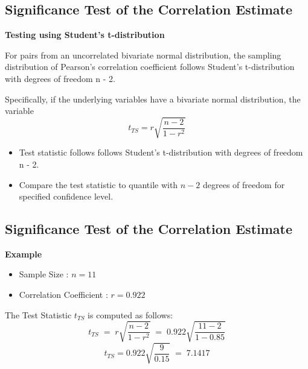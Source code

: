 \documentclass[]{report}
\begin{document}
\newpage




\subsection{Significance Test of the Correlation Estimate}

\textbf{Testing using Student's t-distribution}

For pairs from an uncorrelated bivariate normal distribution, the sampling distribution of Pearson's correlation coefficient follows Student's t-distribution with degrees of freedom n - 2. 




Specifically, if the underlying variables have a bivariate normal distribution, the variable
\[ t_{TS} = r\sqrt{\frac{n-2}{1 - r^2}} \]



\begin{itemize}
	\item Test statistic follows follows Student's t-distribution with degrees of freedom n - 2.
	\item Compare the test statistic to quantile with $n-2$ degrees of freedom for specified confidence level.
\end{itemize}




\subsection{Significance Test of the Correlation Estimate}

\textbf{Example }

\begin{itemize}
	\item Sample Size : $n = 11$
	\item Correlation Coefficient : $r = 0.922$
\end{itemize}

The Test Statistic $t_{TS}$ is computed as follows:\\
\[ t_{TS} \; = \; r\sqrt{\frac{n-2}{1 - r^2}} \; = \; 0.922 \sqrt{\frac{11-2}{1 - 0.85}}  \]
\[ t_{TS} = 0.922 \sqrt{\frac{9}{0.15}} \; = \;  7.1417 \]
\end{document}
